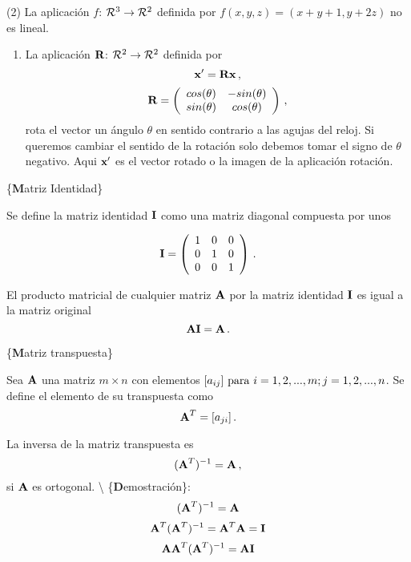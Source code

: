 \documentclass[
]{agujournal2019}
\providecommand{\tightlist}{%
  \setlength{\itemsep}{0pt}\setlength{\parskip}{0pt}}\usepackage{longtable,booktabs,array}
\begin{document}
\vspace{0.5cm} (2) La aplicación \(f\):
\({\cal R}^3 \rightarrow {\cal R}^2\) definida por
\(f(x,y,z)=(x+y+1,y+2z)\) no es lineal.

\vspace{0.5cm}

\begin{enumerate}
\def\labelenumi{(\arabic{enumi})}
\setcounter{enumi}{2}
\tightlist
\item
  La aplicación \({\textbf R}\): \({\cal R}^2 \rightarrow {\cal R}^2\)
  definida por \[{\textbf x}'={\textbf R}{\textbf x}\,,\]
  \[{\textbf R}=\left( \begin{array}{cc}
   cos(\theta) & -sin(\theta)\\
   sin(\theta) & cos(\theta)
     \end{array} \right)\,,\] rota el vector un ángulo \(\theta\) en
  sentido contrario a las agujas del reloj. Si queremos cambiar el
  sentido de la rotación solo debemos tomar el signo de \(\theta\)
  negativo. Aqui \({\textbf x}'\) es el vector rotado o la imagen de la
  aplicación rotación.
\end{enumerate}

\vspace{0.5cm}

\{\noindent \textbf Matriz Identidad\}

Se define la matriz identidad \({\textbf I}\) como una matriz diagonal
compuesta por unos

\[{\textbf I}=\left(\begin{array}{ccc}
  1 & 0 & 0\\
  0 & 1 & 0\\
  0 & 0 & 1
\end{array}\right)\,.\]

El producto matricial de cualquier matriz \({\textbf A}\) por la matriz
identidad \({\textbf I}\) es igual a la matriz original
\[{\textbf A}{\textbf I}={\textbf A}\,.\]

\vspace{0.5cm}

\{\noindent \textbf Matriz transpuesta\}

Sea \({\textbf A}\) una matriz \(m\times n\) con elementos
\([a_{ij}]\,\,{\rm para}\,\,i=1,2,...,m; j=1,2,...,n\). Se define el
elemento de su transpuesta como \[{\textbf A}^T=[a_{ji}]\,.\]

La inversa de la matriz transpuesta es
\[({\textbf A}^T)^{-1}={\textbf A}\,,\] si \({\textbf A}\) es ortogonal.
\textbackslash{} \{\textbf Demostración\}:
\[({\textbf A}^T)^{-1}={\textbf A}\]
\[{\textbf A}^T({\textbf A}^T)^{-1}={\textbf A}^T{\textbf A}={\textbf I}\]
\[{\textbf A}{\textbf A}^T({\textbf A}^T)^{-1}={\textbf A}{\textbf I}\]
\end{document}
